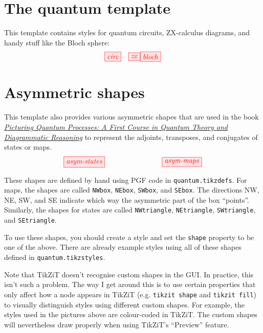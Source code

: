 \documentclass{article}
\begin{document}
\section*{The quantum template}

This template contains styles for quantum circuits, ZX-calculus diagrams, and handy stuff like the Bloch sphere:
\[
\tikzfig{circ} \quad
\tikzfig{zx}
\tikzfig{bloch}
\]

\section*{Asymmetric shapes}

This template also provides various asymmetric shapes that are used in the book \href{http://cambridge.org/PQP}{\color{blue} \textit{Picturing Quantum Processes: A First Course in Quantum Theory and Diagrammatic Reasoning}} to represent the adjoints, transposes, and conjugates of states or maps.
\[
  \tikzfig{asym-states}
  \qquad\qquad\qquad\qquad
  \tikzfig{asym-maps}
\]

These shapes are defined by hand using PGF code in \texttt{quantum.tikzdefs}. For maps, the shapes are called \texttt{NWbox}, \texttt{NEbox}, \texttt{SWbox}, and \texttt{SEbox}. The directions NW, NE, SW, and SE indicate which way the asymmetric part of the box ``points''. Similarly, the shapes for states are called \texttt{NWtriangle}, \texttt{NEtriangle}, \texttt{SWtriangle}, and \texttt{SEtriangle}.

To use these shapes, you should create a style and set the \texttt{shape} property to be one of the above. There are already example styles using all of these shapes defined in \texttt{quantum.tikzstyles}.

Note that TikZiT doesn't recognise custom shapes in the GUI. In practice, this isn't such a problem. The way I get around this is to use certain properties that only affect how a node appears in TikZiT (e.g. \texttt{tikzit shape} and \texttt{tikzit fill}) to visually distinguish styles using different custom shapes. For example, the styles used in the pictures above are colour-coded in TikZiT. The custom shapes will nevertheless draw properly when using TikZiT's ``Preview'' feature.
\end{document}
